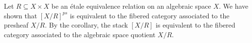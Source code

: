  \begin{example}
   Let $R\subseteq X\times X$ be an \'etale equivalence relation on an algebraic space
   $X$. We have shown that $[X/R]^{ps}$ is equivalent to the fibered category associated
   to the presheaf $X/R$. By the corollary, the stack $[X/R]$ is equivalent to the
   fibered category associated to the algebraic space quotient $X/R$.
 \end{example}
